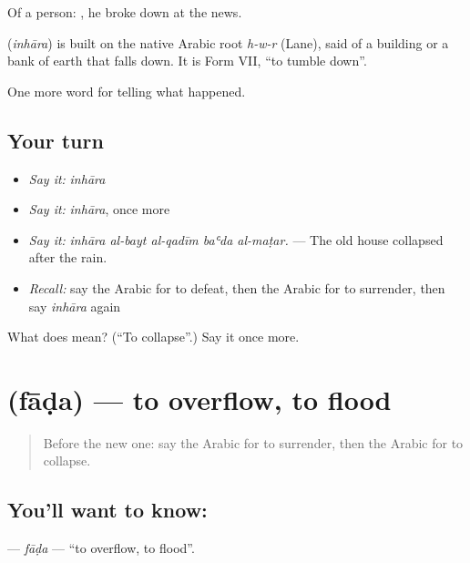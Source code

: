 Of a person:   , he broke down at the news.

\begin{cousinweb}
\textbf{} (\emph{inhāra}) is built on the native Arabic root \emph{h-w-r} (Lane), said of a building or a bank of earth that falls down. It is Form VII, \textquotedblleft{}to tumble down\textquotedblright{}.
\end{cousinweb}

\begin{grammarlens}[title={What you've built}]
One more word for telling what happened.
\end{grammarlens}

\subsection*{Your turn}
\begin{itemize}
\raggedright
  \item \emph{Say it:} \emph{inhāra}
  \item \emph{Say it:} \emph{inhāra}, once more
  \item \emph{Say it:} \emph{inhāra al-bayt al-qadīm baʿda al-maṭar.} — The old house collapsed after the rain.
  \item \emph{Recall:} say the Arabic for to defeat, then the Arabic for to surrender, then say \emph{inhāra} again
\end{itemize}

\begin{tcolorbox}[breakable,colback=teal!4,colframe=teal!35!black,title={Before you move on}]
What does  mean? (\textquotedblleft{}To collapse\textquotedblright{}.) Say it once more.
\end{tcolorbox}
\section[\texorpdfstring{\ar{فاض} (fāḍa)}{فاض (fāḍa)}]{ (fāḍa) — to overflow, to flood}

\label{lesson:AR-C316-fada}



\begin{quote}
Before the new one: say the Arabic for to surrender, then the Arabic for to collapse.
\end{quote}

\subsection*{You'll want to know: }
\textbf{} — \emph{fāḍa} — \textquotedblleft{}to overflow, to flood\textquotedblright{}.


